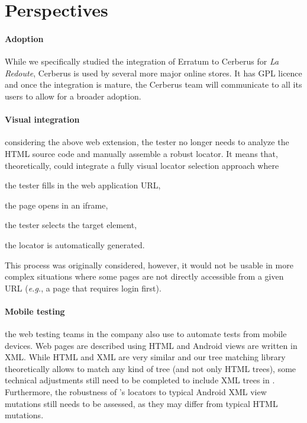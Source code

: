 \section{Perspectives}\label{cerberus:sec:perspectives}
\paragraph{Adoption}
While we specifically studied the integration of Erratum to Cerberus for \emph{La Redoute}, Cerberus is used by several more major online stores. It has GPL licence and once the integration is mature, the Cerberus team will communicate to all its users to allow for a broader adoption.

\paragraph{Visual integration}
considering the above \erratum web extension, the tester no longer needs to analyze the HTML source code and manually assemble a robust locator.
It means that, theoretically, \cerberus could integrate a fully visual locator selection approach where
\begin{inparaenum}[\em (i)]
    \item the tester fills in the web application URL,
    \item the page opens in an iframe,
    \item the tester selects the target element,
    \item the \erratum locator is automatically generated.
\end{inparaenum}
This process was originally considered, however, it would not be usable in more complex situations where some pages are not directly accessible from a given URL (\emph{e.g.}, a page that requires login first).

\paragraph{Mobile testing}
the web testing teams in the \laredoute{} company also use \cerberus to automate tests from mobile devices.
Web pages are described using HTML and Android views are written in XML.
While HTML and XML are very similar and our tree matching library theoretically allows \erratum to match any kind of tree (and not only HTML trees), some technical adjustments still need to be completed to include XML trees in \cerberus.
Furthermore, the robustness of \erratum's locators to typical Android XML view mutations still needs to be assessed, as they may differ from typical HTML mutations.

